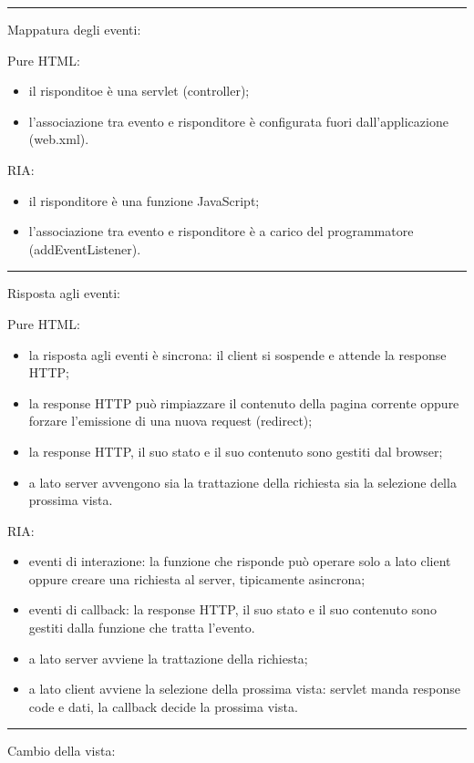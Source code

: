 \rule{\textwidth}{0,4pt}
Mappatura degli eventi:
\begin{multicols}{2}
Pure HTML:
\begin{itemize}
    \item il risponditoe è una servlet (controller);
    \item l'associazione tra evento e risponditore è configurata fuori dall'applicazione (web.xml).
\end{itemize}
\vfill\null
\columnbreak
RIA:
\begin{itemize}
    \item il risponditore è una funzione JavaScript;
    \item l'associazione tra evento e risponditore è a carico del programmatore (addEventListener).
\end{itemize}
\end{multicols}
\rule{\textwidth}{0,4pt}
Risposta agli eventi:
\begin{multicols}{2}
Pure HTML:
\begin{itemize}
    \item la risposta agli eventi è sincrona: il client si sospende e attende la response HTTP;
    \item la response HTTP può rimpiazzare il contenuto della pagina corrente oppure forzare l'emissione di una nuova request (redirect);
    \item la response HTTP, il suo stato e il suo contenuto sono gestiti dal browser;
    \item a lato server avvengono sia la trattazione della richiesta sia la selezione della prossima vista.
\end{itemize}
\vfill\null
\columnbreak
RIA:
\begin{itemize}
    \item eventi di interazione: la funzione che risponde può operare solo a lato client oppure creare una richiesta al server, tipicamente asincrona;
    \item eventi di callback: la response HTTP, il suo stato e il suo contenuto sono gestiti dalla funzione che tratta l'evento.
    \item a lato server avviene la trattazione della richiesta;
    \item a lato client avviene la selezione della prossima vista: servlet manda response code e dati, la callback decide la prossima vista.
\end{itemize}
\end{multicols}
\rule{\textwidth}{0,4pt}
Cambio della vista:
